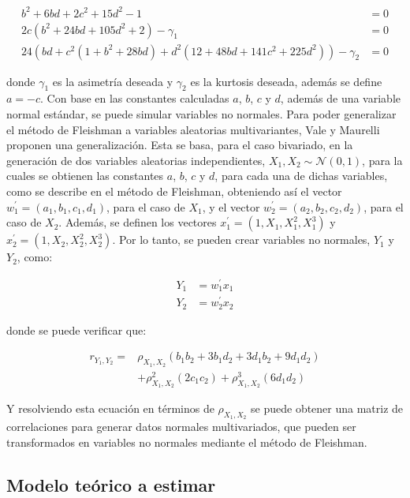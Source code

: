 \documentclass[
]{article}
\begin{document}
\begin{align}
  b^2 + 6bd + 2c^2 + 15d^2 -1 & = 0 \\
  2c (b^2 + 24bd + 105d^2 + 2) - \gamma_1 & = 0 \\
  24 \left(bd + c^2 (1 + b^2 + 28bd) + d^2 (12 + 48bd + 141c^2 + 225d^2) \right) - \gamma_2 & = 0
\end{align}

donde \(\gamma_1\) es la asimetría deseada y \(\gamma_2\) es la kurtosis
deseada, además se define \(a = -c\). Con base en las constantes
calculadas \(a\), \(b\), \(c\) y \(d\), además de una variable normal
estándar, se puede simular variables no normales. Para poder generalizar
el método de Fleishman a variables aleatorias multivariantes, Vale y
Maurelli proponen una generalización. Esta se basa, para el caso
bivariado, en la generación de dos variables aleatorias independientes,
\(X_1, X_2 \sim \mathcal{N} (0,1)\), para la cuales se obtienen las
constantes \(a\), \(b\), \(c\) y \(d\), para cada una de dichas
variables, como se describe en el método de Fleishman, obteniendo así el
vector \(w^\prime_1 = (a_1, b_1, c_1, d_1)\), para el caso de \(X_1\), y
el vector \(w^\prime_2 = (a_2, b_2, c_2, d_2)\), para el caso de
\(X_2\). Además, se definen los vectores
\(x_1^\prime = (1, X_1, X_1^2, X_1^3)\) y
\(x_2^\prime = (1, X_2, X_2^2, X_2^3)\). Por lo tanto, se pueden crear
variables no normales, \(Y_1\) y \(Y_2\), como:

\begin{align*}
  Y_1 & = w_1^\prime x_1 \\
  Y_2 & = w_2^\prime x_2
\end{align*}

donde se puede verificar que:

\begin{align*}
  r_{Y_1, Y_2} = & \rho_{X_1, X_2} (b_1 b_2 + 3b_1 d_2 + 3d_1 b_2 + 9 d_1 d_2) \\
  & + \rho_{X_1, X_2}^2 (2 c_1 c_2) + \rho_{X_1, X_2}^3 (6 d_1 d_2)
\end{align*}

Y resolviendo esta ecuación en términos de \(\rho_{X_1, X_2}\) se puede
obtener una matriz de correlaciones para generar datos normales
multivariados, que pueden ser transformados en variables no normales
mediante el método de Fleishman.

\subsection{Modelo teórico a estimar}
\end{document}
